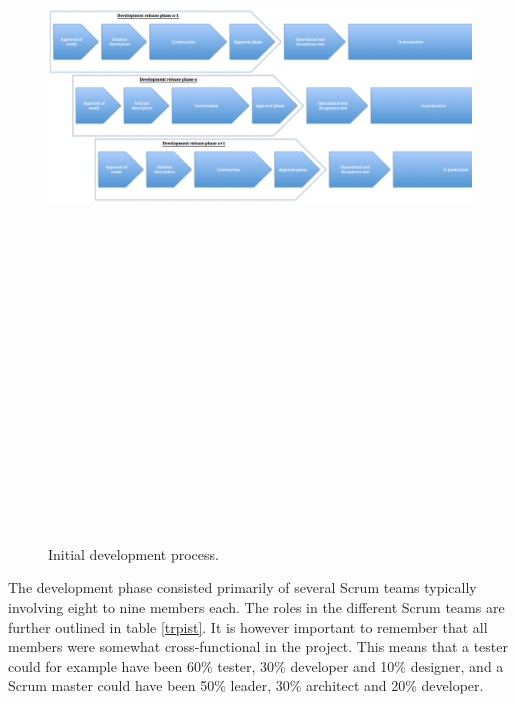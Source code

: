 \begin{figure}
\centering
\includegraphics[angle=90, trim = 0mm 0mm 20mm 0mm,width=160mm, height=230mm]{images/initial_development_process}
\caption{Initial development process.}
\label{initial_development_process}
\end{figure}

The development phase consisted primarily of several Scrum teams typically involving eight to nine members each. The roles in the different Scrum teams are further outlined in table \ref{trpist}. It is however important to remember that all members were somewhat cross-functional in the project. This means that a tester could for example have been 60\% tester, 30\% developer and 10\% designer, and a Scrum master could have been 50\% leader, 30\% architect and 20\% developer. 

